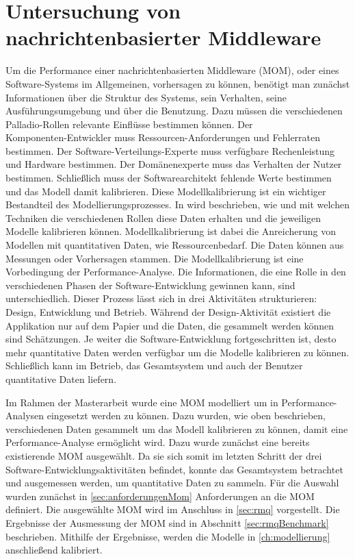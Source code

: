 

\chapter{Untersuchung von nachrichtenbasierter Middleware}
\label{ch:mom}
Um die Performance einer nachrichtenbasierten Middleware (MOM), oder eines Software-Systems im Allgemeinen, vorhersagen zu können, benötigt man zunächst Informationen über die Struktur des Systems, sein Verhalten, seine Ausführungsumgebung und über die Benutzung. Dazu müssen die verschiedenen Palladio-Rollen relevante Einflüsse bestimmen können. Der \\ Komponenten-Entwickler muss Ressourcen-Anforderungen und Fehlerraten bestimmen. Der Software-Verteilungs-Experte muss verfügbare Rechenleistung und Hardware bestimmen. Der Domänenexperte muss das Verhalten der Nutzer bestimmen. Schließlich muss der Softwarearchitekt fehlende Werte bestimmen und das Modell damit kalibrieren. Diese Modellkalibrierung ist ein wichtiger Bestandteil des Modellierungsprozesses. In \cite{palladio17} wird beschrieben, wie und mit welchen Techniken die verschiedenen Rollen diese Daten erhalten und die jeweiligen Modelle kalibrieren können. Modellkalibrierung ist dabei die Anreicherung von Modellen mit quantitativen Daten, wie Ressourcenbedarf. Die Daten können aus Messungen oder Vorhersagen stammen. Die Modellkalibrierung ist eine Vorbedingung der Performance-Analyse. Die Informationen, die eine Rolle in den verschiedenen Phasen der Software-Entwicklung gewinnen kann, sind unterschiedlich. Dieser Prozess lässt sich in drei Aktivitäten strukturieren: Design, Entwicklung und Betrieb. Während der Design-Aktivität existiert die Applikation nur auf dem Papier und die Daten, die gesammelt werden können sind Schätzungen. Je weiter die Software-Entwicklung fortgeschritten ist, desto mehr quantitative Daten werden verfügbar um die Modelle kalibrieren zu können. Schließlich kann im Betrieb, das Gesamtsystem und auch der Benutzer quantitative Daten liefern. 

Im Rahmen der Masterarbeit wurde eine MOM modelliert um in Performance-Ana\-ly\-sen eingesetzt werden zu können. Dazu wurden, wie oben beschrieben, verschiedenen Daten gesammelt um das Modell kalibrieren zu können, damit eine Performance-Analyse ermöglicht wird. Dazu wurde zunächst eine bereits existierende MOM ausgewählt. Da sie sich somit im letzten Schritt der drei Software-Entwicklungsaktivitäten befindet, konnte das Gesamtsystem betrachtet und ausgemessen werden, um quantitative Daten zu sammeln. Für die Auswahl wurden zunächst in \autoref{sec:anforderungenMom} Anforderungen an die MOM definiert. Die ausgewählte MOM wird im Anschluss in \autoref{sec:rmq} vorgestellt. Die Ergebnisse der Ausmessung der MOM sind in Abschnitt \ref{sec:rmqBenchmark} beschrieben. Mithilfe der Ergebnisse, werden die Modelle in \autoref{ch:modellierung} anschließend kalibriert.


